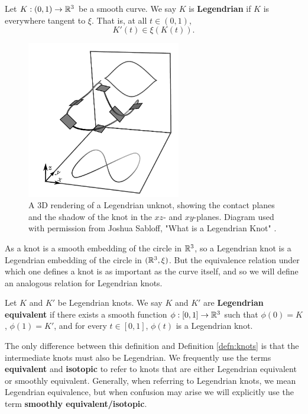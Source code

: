 \begin{definition}
    Let $K: (0, 1) \to \mathbb{R}^3$ be a smooth curve. We say $K$ is \textbf{Legendrian} if $K$ is everywhere tangent to $\xi$. That is, at all $t \in (0, 1)$,
    \[
        K'(t) \in \xi(K(t)).
    \]
\end{definition}

\begin{figure}
    \centering
    \includegraphics[width=0.6\textwidth]{images/Sabloff-3D.pdf}
    \caption{A 3D rendering of a Legendrian unknot, showing the contact planes and the shadow of the knot in the $xz$- and $xy$-planes. Diagram used with permission from Joshua Sabloff, "What is a Legendrian Knot" \cite{sabloff-whatis}.}
    \label{fig:sabloff-3d}
\end{figure}

As a knot is a smooth embedding of the circle in $\mathbb{R}^3$, so a Legendrian knot is a Legendrian embedding of the circle in $(\mathbb{R}^3, \xi)$. But the equivalence relation under which one defines a knot is as important as the curve itself, and so we will define an analogous relation for Legendrian knots. 

\begin{definition}
    Let $K$ and $K'$ be Legendrian knots. We say $K$ and $K'$ are \textbf{Legendrian equivalent} if there exists a smooth function ${\phi: [0, 1] \to \mathbb{R}^3}$ such that
    ${\phi(0) = K}$, ${\phi(1) = K'}$, and for every ${t \in [0, 1]}$, $\phi(t)$ is a Legendrian knot.
\end{definition}

The only difference between this definition and Definition \ref{defn:knots} is that the intermediate knots must also be Legendrian.
We frequently use the terms \textbf{equivalent} and \textbf{isotopic} to refer to knots that are either Legendrian equivalent or smoothly equivalent. Generally, when referring to Legendrian knots, we mean Legendrian equivalence, but when confusion may arise we will explicitly use the term \textbf{smoothly equivalent/isotopic}.

